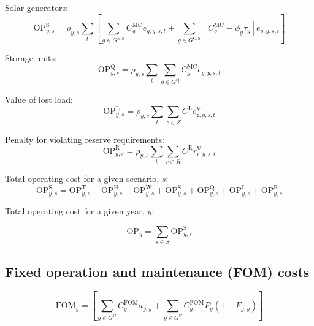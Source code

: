 \documentclass{article}
\newcommand{\sGeneratorsExisting}{G^{\mathrm{E}}}
\newcommand{\sGeneratorsExistingSolar}{G^{\mathrm{E,S}}}
\newcommand{\sGeneratorsCandidate}{G^{\mathrm{C}}}
\newcommand{\sGeneratorsCandidateSolar}{G^{\mathrm{C,S}}}
\newcommand{\sStorage}{G^{\mathrm{Q}}}
\newcommand{\sScenarios}{S}
\newcommand{\sZones}{Z}
\newcommand{\sRegions}{R}
\newcommand{\sScenariosYear}{\sScenarios_{\iYear}}
\newcommand{\iGenerator}{g}
\newcommand{\iYear}{y}
\newcommand{\iScenario}{s}
\newcommand{\iInterval}{t}
\newcommand{\iZone}{z}
\newcommand{\iRegion}{r}
\newcommand{\cOperatingCost}[1][\iYear,\iScenario]{\mathrm{OP}_{#1}}
\newcommand{\cOperatingCostThermal}[1][\iYear,\iScenario]{\mathrm{OP}^{\mathrm{T}}_{#1}}
\newcommand{\cOperatingCostHydro}[1][\iYear,\iScenario]{\mathrm{OP}^{\mathrm{H}}_{#1}}
\newcommand{\cOperatingCostWind}[1][\iYear,\iScenario]{\mathrm{OP}^{\mathrm{W}}_{#1}}
\newcommand{\cOperatingCostSolar}[1][\iYear,\iScenario]{\mathrm{OP}^{\mathrm{S}}_{#1}}
\newcommand{\cOperatingCostStorage}[1][\iYear,\iScenario]{\mathrm{OP}^{\mathrm{Q}}_{#1}}
\newcommand{\cFixedOperationsMaintenanceCost}[1][\iGenerator]{\mathrm{FOM}_{#1}}
\newcommand{\cFixedOperationsMaintenanceCostGenerator}[1][\iGenerator]{C^{\mathrm{FOM}}_{#1}}
\newcommand{\cScenarioDuration}[1][\iYear,\iScenario]{\rho_{#1}}
\newcommand{\cMarginalCost}[1][\iGenerator,\iYear]{C^{\mathrm{MC}}_{#1}}
\newcommand{\cPowerOutputMax}[1][\iGenerator,\iYear]{\overline{P}_{#1}}
\newcommand{\cOperatingCostLostLoad}[1][\iYear,\iScenario]{\mathrm{OP}^{\mathrm{L}}_{#1}}
\newcommand{\cLostLoadCost}{C^{\mathrm{L}}}
\newcommand{\cReserveUpViolationPenalty}{C^{\mathrm{R}}}
\newcommand{\cOperatingCostReserveUpViolation}[1][\iYear,\iScenario]{\mathrm{OP}^{\mathrm{R}}_{#1}}
\newcommand{\cOperatingCostScenario}[1][\iYear,\iScenario]{\mathrm{OP}^{\mathrm{\sScenarios}}_{#1}}
\newcommand{\cRetirementIndicator}[1][\iGenerator,\iYear]{F_{#1}}
\newcommand{\vBaseline}[1][\iYear]{\phi_{#1}}
\newcommand{\vPermitPrice}[1][\iYear]{\tau_{#1}}
\newcommand{\vEnergy}[1][\iGenerator,\iYear,\iScenario,\iInterval]{e_{#1}}
\newcommand{\vReserveUpViolation}[1][\iRegion,\iYear,\iScenario,\iInterval]{r^{\mathrm{V}}_{#1}}
\newcommand{\vLostLoadEnergy}[1][\iZone,\iYear,\iScenario,\iInterval]{e^{\mathrm{V}}_{#1}}
\newcommand{\vInstalledCapacityTotal}[1][\iGenerator,\iYear]{a_{#1}}
\begin{document}
Solar generators:
\begin{equation}
	\cOperatingCostSolar = \cScenarioDuration \sum\limits_{\iInterval}\left[\sum\limits_{\iGenerator \in \sGeneratorsExistingSolar} \cMarginalCost[\iGenerator] \vEnergy + \sum\limits_{\iGenerator \in \sGeneratorsCandidateSolar} \left[\cMarginalCost[\iGenerator] - \vBaseline\vPermitPrice\right] \vEnergy\right]
\end{equation}

Storage units:
\begin{equation}
	\cOperatingCostStorage = \cScenarioDuration\sum\limits_{\iInterval}\sum\limits_{\iGenerator \in \sStorage} \cMarginalCost[\iGenerator] \vEnergy
\end{equation}

Value of lost load:
\begin{equation}
	\cOperatingCostLostLoad = \cScenarioDuration\sum\limits_{\iInterval}\sum\limits_{\iZone \in \sZones} \cLostLoadCost \vLostLoadEnergy
\end{equation}

Penalty for violating reserve requirements:
\begin{equation}
	\cOperatingCostReserveUpViolation = \cScenarioDuration\sum\limits_{\iInterval}\sum\limits_{\iRegion \in \sRegions} \cReserveUpViolationPenalty \vReserveUpViolation
\end{equation}

Total operating cost for a given scenario, $\iScenario$:
\begin{equation}
	\cOperatingCostScenario = \cOperatingCostThermal + \cOperatingCostHydro + \cOperatingCostWind + \cOperatingCostSolar + \cOperatingCostStorage + \cOperatingCostLostLoad + \cOperatingCostReserveUpViolation
\end{equation}

Total operating cost for a given year, $\iYear$:

\begin{equation}
	\cOperatingCost[\iYear] = \sum\limits_{\iScenario \in \sScenarios} \cOperatingCostScenario
\end{equation}

\subsection{Fixed operation and maintenance (FOM) costs}

\begin{equation}
	\cFixedOperationsMaintenanceCost[\iYear] = \left[\sum\limits_{\iGenerator \in \sGeneratorsCandidate} \cFixedOperationsMaintenanceCostGenerator \vInstalledCapacityTotal + \sum\limits_{\iGenerator \in \sGeneratorsExisting} \cFixedOperationsMaintenanceCostGenerator \cPowerOutputMax[\iGenerator] \left(1 - \cRetirementIndicator\right) \right]
\end{equation}
\end{document}
